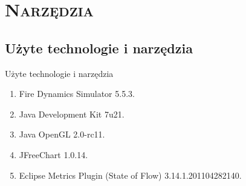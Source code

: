 \section{\scshape Narzędzia}

\subsection{Użyte technologie i narzędzia}
\begin{frame}{Użyte technologie i narzędzia}

\begin{enumerate}
  \item Fire Dynamics Simulator 5.5.3.
  \item Java Development Kit 7u21.
  \item Java OpenGL 2.0-rc11.
  \item JFreeChart 1.0.14.
  \item Eclipse Metrics Plugin (State of Flow) 3.14.1.201104282140.
\end{enumerate}

\end{frame}